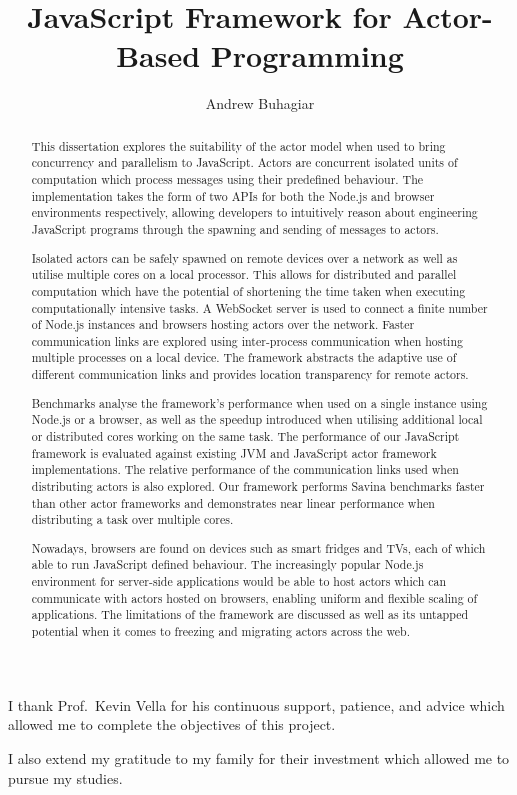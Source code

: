 \documentclass[oneside]{um-fict}
\title{JavaScript Framework for Actor-Based Programming}  %
\author{Andrew Buhagiar}            %
\begin{document}
\frontmatter 
\maketitle
\begin{acknowledgements}
I thank Prof.\ Kevin Vella for his continuous support, patience, and advice which allowed me to complete the objectives of this project.

I also extend my gratitude to my family for their investment which allowed me to pursue my studies.
\end{acknowledgements}   %
\begin{abstract}
This dissertation explores the suitability of the actor model when used to bring concurrency and parallelism to JavaScript. Actors are concurrent isolated units of computation which process messages using their predefined behaviour. The implementation takes the form of two APIs for both the Node.js and browser environments respectively, allowing developers to intuitively reason about engineering JavaScript programs through the spawning and sending of messages to actors.

Isolated actors can be safely spawned on remote devices over a network as well as utilise multiple cores on a local processor. This allows for distributed and parallel computation which have the potential of shortening the time taken when executing computationally intensive tasks. A WebSocket server is used to connect a finite number of Node.js instances and browsers hosting actors over the network. Faster communication links are explored using inter-process communication when hosting multiple processes on a local device. The framework abstracts the adaptive use of different communication links and provides location transparency for remote actors.

Benchmarks analyse the framework's performance when used on a single instance using Node.js or a browser, as well as the speedup introduced when utilising additional local or distributed cores working on the same task. The performance of our JavaScript framework is evaluated against existing JVM and JavaScript actor framework implementations. The relative performance of the communication links used when distributing actors is also explored. Our framework performs Savina benchmarks faster than other actor frameworks and demonstrates near linear performance when distributing a task over multiple cores.

Nowadays, browsers are found on devices such as smart fridges and TVs, each of which able to run JavaScript defined behaviour. The increasingly popular Node.js environment for server-side applications would be able to host actors which can communicate with actors hosted on browsers, enabling uniform and flexible scaling of applications. The limitations of the framework are discussed as well as its untapped potential when it comes to freezing and migrating actors across the web.
\end{abstract}\if@openright\cleardoublepage\else\clearpage\fi
\tableofcontents*\if@openright\cleardoublepage\else\clearpage\fi
\listoffigures*\if@openright\cleardoublepage\else\clearpage
\listoftables*\if@openright\cleardoublepage\else\clearpage\fi
\end{document}
